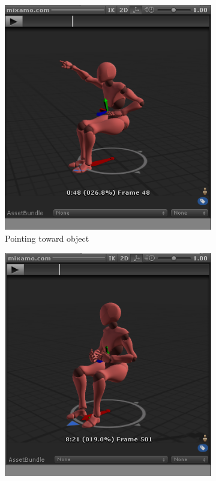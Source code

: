 \documentclass[18pt]{article}
\numberwithin{equation}{section} %
\numberwithin{figure}{section} %
\numberwithin{table}{section} %
\begin{document}
\begin{figure}[H]
\begin{subfigure}{0.2\textwidth}
			\includegraphics[width=0.96\linewidth]{images/sit_point}
			\caption{Pointing toward object}
		\end{subfigure}		
		\begin{subfigure}{0.2\textwidth}
			\centering
			\includegraphics[width=0.96\linewidth]{images/sit_talk}

\end{subfigure}
\end{figure}
\end{document}

